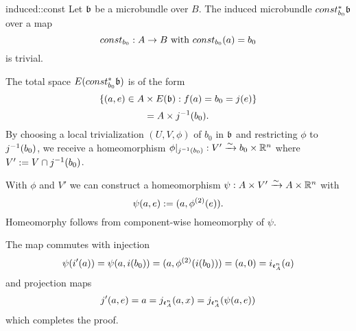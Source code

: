 \begin{mylemma}{induced::const}{}
    Let $\mathfrak{b}$ be a microbundle over $B$. The induced microbundle $const_{b_0}^*\mathfrak{b}$ over a map
    \[ const_{b_0}: A \to B \text{ with } const_{b_0}(a) = b_0 \]
    is trivial.
\end{mylemma}

\begin{myproof}
    The total space $E(const_{b_0}^*\mathfrak{b})$ is of the form
    \[ \{(a, e) \in A \times E(\mathfrak{b}):f(a) = b_0 = j(e)\} \]
    \[ = A \times j^{-1}(b_0). \]
    By choosing a local trivialization $(U, V, \phi)$ of $b_0$ in $\mathfrak{b}$ and restricting $\phi$ to $j^{-1}(b_0)$,
    we receive a homeomorphism $\phi\vert_{j^{-1}(b_0)}: V' \xrightarrow{\sim} b_0 \times \mathbb{R}^n$ where $V' := V \cap j^{-1}(b_0)$.
    
    With $\phi$ and $V'$ we can construct a homeomorphism $\psi: A \times V' \xrightarrow{\sim} A \times \mathbb{R}^n$ with
    \[ \psi(a, e) := (a, \phi^{(2)}(e)). \]
    Homeomorphy follows from component-wise homeomorphy of $\psi$.

    The map commutes with injection
    \[ \psi(i'(a)) = \psi(a, i(b_0)) = (a, \phi^{(2)}(i(b_0))) = (a, 0) = i_{\mathfrak{e}^{n}_{A}}(a) \]
    and projection maps
    \[ j'(a, e) = a = j_{\mathfrak{e}^{n}_{A}}(a, x) = j_{\mathfrak{e}^{n}_{A}}(\psi(a, e)) \]
    which completes the proof.
\end{myproof}